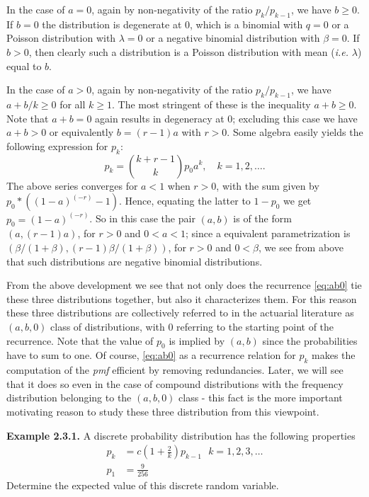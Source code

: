 \documentclass[]{book}
\theoremstyle{definition}
\theoremstyle{definition}
\theoremstyle{definition}
\theoremstyle{remark}
\begin{document}
In the case of \(a=0\), again by non-negativity of the ratio
\(p_k/p_{k-1}\), we have \(b\geq 0\). If \(b=0\) the distribution is
degenerate at \(0\), which is a binomial with \(q=0\) or a Poisson
distribution with \(\lambda=0\) or a negative binomial distribution with
\(\beta=0\). If \(b>0\), then clearly such a distribution is a Poisson
distribution with mean (\emph{i.e.} \(\lambda\)) equal to \(b\).

In the case of \(a>0\), again by non-negativity of the ratio
\(p_k/p_{k-1}\), we have \(a+b/k\geq 0\) for all \(k\geq 1\). The most
stringent of these is the inequality \(a+b\geq 0\). Note that \(a+b=0\)
again results in degeneracy at \(0\); excluding this case we have
\(a+b>0\) or equivalently \(b=(r-1)a\) with \(r>0\). Some algebra easily
yields the following expression for \(p_k\): \[
p_k = \binom{k+r-1}{k} p_0 a^k, \quad k=1,2,\ldots.
\] The above series converges for \(a<1\) when \(r>0\), with the sum
given by \(p_0*((1-a)^{(-r)}-1)\). Hence, equating the latter to
\(1-p_0\) we get \(p_0=(1-a)^{(-r)}\). So in this case the pair
\((a,b)\) is of the form \((a,(r-1)a)\), for \(r>0\) and \(0<a<1\);
since a equivalent parametrization is
\((\beta/(1+\beta),(r-1)\beta/(1+\beta))\), for \(r>0\) and \(0<\beta\),
we see from above that such distributions are negative binomial
distributions.

From the above development we see that not only does the recurrence
\eqref{eq:ab0} tie these three distributions together, but also it
characterizes them. For this reason these three distributions are
collectively referred to in the actuarial literature as \((a,b,0)\)
class of distributions, with \(0\) referring to the starting point of
the recurrence. Note that the value of \(p_0\) is implied by \((a,b)\)
since the probabilities have to sum to one. Of course, \eqref{eq:ab0} as a
recurrence relation for \(p_k\) makes the computation of the \emph{pmf}
efficient by removing redundancies. Later, we will see that it does so
even in the case of compound distributions with the frequency
distribution belonging to the \((a,b,0)\) class - this fact is the more
important motivating reason to study these three distribution from this
viewpoint.

\textbf{Example 2.3.1.} A discrete probability distribution has the
following properties \[
\begin{aligned}
p_k&=c\left( 1+\frac{2}{k}\right) p_{k-1} \:\:\: k=1,2,3,\ldots\\
p_1&= \frac{9}{256}
\end{aligned}
\] Determine the expected value of this discrete random variable.
\end{document}
